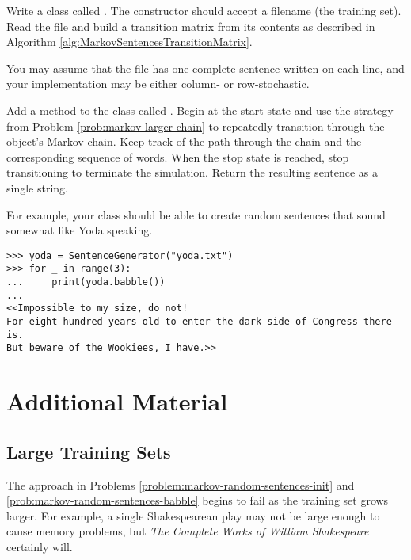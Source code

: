 \begin{problem} %
Write a class called .
The constructor should accept a filename (the training set).
Read the file and build a transition matrix from its contents as described in Algorithm \ref{alg:MarkovSentencesTransitionMatrix}.

You may assume that the file has one complete sentence written on each line, and your implementation may be either column- or row-stochastic.
\label{problem:markov-random-sentences-init}
\end{problem}

\begin{problem} %
Add a method to the  class called .
Begin at the start state and use the strategy from Problem \ref{prob:markov-larger-chain} to repeatedly transition through the object's Markov chain.
Keep track of the path through the chain and the corresponding sequence of words.
When the stop state is reached, stop transitioning to terminate the simulation.
Return the resulting sentence as a single string.

For example, your  class should be able to create random sentences that sound somewhat like Yoda speaking.

\begin{lstlisting}
>>> yoda = SentenceGenerator("yoda.txt")
>>> for _ in range(3):
... 	print(yoda.babble())
...
<<Impossible to my size, do not!
For eight hundred years old to enter the dark side of Congress there is.
But beware of the Wookiees, I have.>>
\end{lstlisting}

\label{prob:markov-random-sentences-babble}
\end{problem}

\newpage

\section*{Additional Material} %

\subsection*{Large Training Sets} %

The approach in Problems \ref{problem:markov-random-sentences-init} and \ref{prob:markov-random-sentences-babble} begins to fail as the training set grows larger.
For example, a single Shakespearean play may not be large enough to cause memory problems, but \emph{The Complete Works of William Shakespeare} certainly will.

